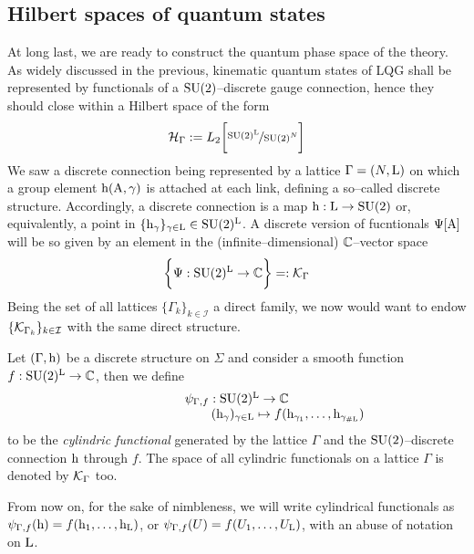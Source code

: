 \subsection{Hilbert spaces of quantum states}

At long last, we are ready to construct the quantum phase space of the theory. As widely discussed in the previous, kinematic quantum states of LQG shall be represented by functionals of a $\text{\normalfont SU}(2)$--discrete gauge connection, hence they should close within a Hilbert space of the form
$$\mathcal{H}_\Gamma:=L_2\bigg[\nicefrac{\text{\normalfont SU}(2)^{\text{\normalfont L}}}{\text{\normalfont SU}(2)^N}\bigg]$$
We saw a discrete connection being represented by a lattice $\Gamma=(N,\text{\normalfont L})$ on which a group element $\text{\normalfont h}(\text{\normalfont A},\gamma)$ is attached at each link, defining a so--called discrete structure. Accordingly, a discrete connection is a map $\text{\normalfont h}:\text{\normalfont L}\to\text{\normalfont SU}(2)$ or, equivalently, a point in $\{\text{\normalfont h}_\gamma\}_{\gamma\in\text{\normalfont L}}\in\text{\normalfont SU}(2)^{\text{\normalfont L}}$. A discrete version of fucntionals $\Psi[\text{\normalfont A}]$ will be so given by an element in the (infinite--dimensional) $\mathbb{C}$--vector space
$$\bigg\{\Psi:\text{\normalfont SU}(2)^{\text{\normalfont L}}\to\mathbb{C}\bigg\}=:\mathcal{K}_\Gamma$$
Being the set of all lattices $\{\Gamma_k\}_{k\in\mathcal{I}}$ a direct family, we now would want to endow $\{\mathcal{K}_{\Gamma_k}\}_{k\in\mathcal{I}}$ with the same direct structure.

\begin{defi}
    Let $(\Gamma,\text{\normalfont h})$ be a discrete structure on $\Sigma$ and consider a smooth function $f:\text{\normalfont SU}(2)^{\text{\normalfont L}}\to\mathbb{C}$, then we define
    $$\begin{matrix}
        \psi_{\Gamma,f}:\text{\normalfont SU}(2)^{\text{\normalfont L}}\to\mathbb{C}\\
        \qquad\qquad\qquad\qquad(\text{\normalfont h}_\gamma)_{\gamma\in\text{\normalfont L}}\mapsto f(\text{\normalfont h}_{\gamma_1},\hdots,\text{\normalfont h}_{\gamma_{\#\text{\normalfont L}}})
    \end{matrix}$$
    to be the \emph{cylindric functional} generated by the lattice $\Gamma$ and the $\text{\normalfont SU}(2)$--discrete connection $\text{\normalfont h}$ through $f$. The space of all cylindric functionals on a lattice $\Gamma$ is denoted by $\mathcal{K}_\Gamma$ too.
\end{defi}

\begin{note}
    From now on, for the sake of nimbleness, we will write cylindrical functionals as $\psi_{\Gamma,f}(\text{\normalfont h})=f(\text{\normalfont h}_1,\hdots,\text{\normalfont h}_{\text{\normalfont L}})$, or $\psi_{\Gamma,f}(U)=f(U_1,\hdots,U_{\text{\normalfont L}})$, with an abuse of notation on $\text{\normalfont L}$.
\end{note}

